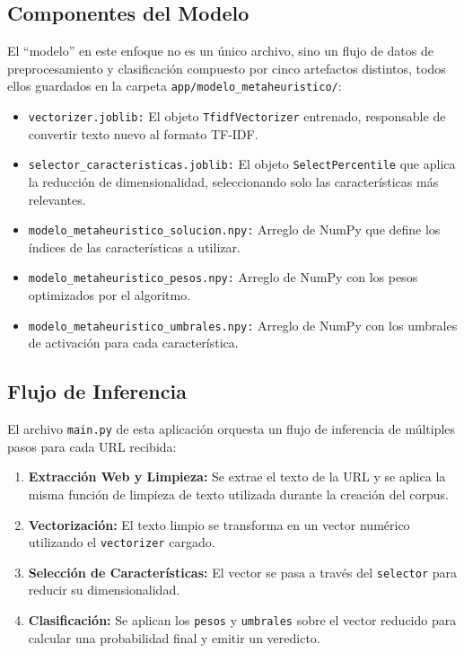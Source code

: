 \subsection{Componentes del Modelo}
El ``modelo'' en este enfoque no es un único archivo, sino un flujo de datos de preprocesamiento y clasificación compuesto por cinco artefactos distintos, todos ellos guardados en la carpeta \texttt{app/modelo\_metaheuristico/}:
\begin{itemize}
    \item \texttt{vectorizer.joblib:} El objeto \texttt{TfidfVectorizer} entrenado, responsable de convertir texto nuevo al formato TF-IDF.
    \item \texttt{selector\_caracteristicas.joblib:} El objeto \texttt{SelectPercentile} que aplica la reducción de dimensionalidad, seleccionando solo las características más relevantes.
    \item \texttt{modelo\_metaheuristico\_solucion.npy:} Arreglo de NumPy que define los índices de las características a utilizar.
    \item \texttt{modelo\_metaheuristico\_pesos.npy:} Arreglo de NumPy con los pesos optimizados por el algoritmo.
    \item \texttt{modelo\_metaheuristico\_umbrales.npy:} Arreglo de NumPy con los umbrales de activación para cada característica.
\end{itemize}

\subsection{Flujo de Inferencia}
El archivo \texttt{main.py} de esta aplicación orquesta un flujo de inferencia de múltiples pasos para cada URL recibida:
\begin{enumerate}
    \item \textbf{Extracción Web y Limpieza:} Se extrae el texto de la URL y se aplica la misma función de limpieza de texto utilizada durante la creación del corpus.
    \item \textbf{Vectorización:} El texto limpio se transforma en un vector numérico utilizando el \texttt{vectorizer} cargado.
    \item \textbf{Selección de Características:} El vector se pasa a través del \texttt{selector} para reducir su dimensionalidad.
    \item \textbf{Clasificación:} Se aplican los \texttt{pesos} y \texttt{umbrales} sobre el vector reducido para calcular una probabilidad final y emitir un veredicto.
\end{enumerate}

